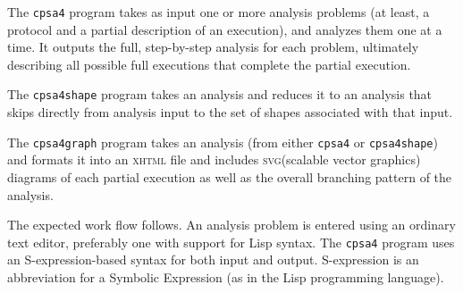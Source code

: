 The \texttt{cpsa4} program takes as input one or more analysis problems
(at least, a protocol and a partial description of an execution), and
analyzes them one at a time.  It outputs the full, step-by-step
analysis for each problem, ultimately describing all possible full
executions that complete the partial execution.

The \texttt{cpsa4shape} program takes an analysis and reduces it to an
analysis that skips directly from analysis input to the set of shapes
associated with that input.

The \texttt{cpsa4graph} program takes an analysis (from either
\texttt{cpsa4} or \texttt{cpsa4shape}) and formats it into an
\textsc{xhtml} file and includes \textsc{svg}(scalable vector
graphics) diagrams of each partial execution as well as the overall
branching pattern of the analysis.


%

The expected work flow follows.  An analysis problem is entered using
an ordinary text editor, preferably one with support for Lisp syntax.
The \texttt{cpsa4} program uses an S-expression-based syntax for both
input and output.  S-expression is an abbreviation for a Symbolic
Expression (as in the Lisp programming language).

